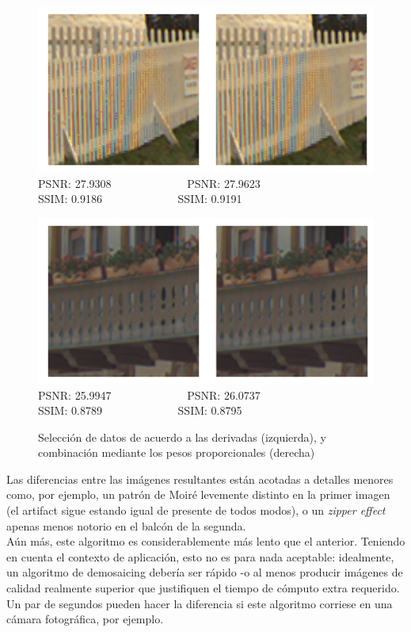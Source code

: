 \documentclass[a4paper]{article}
\begin{document}
\begin{figure}[h!]
	\begin{center}
	    \includegraphics[scale=0.47]{imagenes/Splines/RecortesSplines/prop/cerco.png}\\
	    PSNR: 27.9308 \ \ \ \ \ \ \ \ \ \ \ \ \ PSNR: 27.9623\\
	    SSIM: 0.9186 \ \ \ \ \ \ \ \ \ \ \ \ \ SSIM: 0.9191
	\end{center}
	\begin{center}
	    \includegraphics[scale=0.47]{imagenes/Splines/RecortesSplines/prop/balcon.png}\\
	    PSNR: 25.9947 \ \ \ \ \ \ \ \ \ \ \ \ \ PSNR: 26.0737\\
	    SSIM: 0.8789 \ \ \ \ \ \ \ \ \ \ \ \ \ SSIM: 0.8795
	\end{center}
	\caption{Selección de datos de acuerdo a las derivadas (izquierda), y combinación mediante los pesos proporcionales (derecha)}
	\label{splines4}
\end{figure}

Las diferencias entre las imágenes resultantes están acotadas a detalles menores como, por ejemplo, un patrón de Moiré levemente distinto en la primer imagen (el artifact sigue estando igual de presente de todos modos), o un \textit{zipper effect} apenas menos notorio en el balcón de la segunda.\\

Aún más, este algoritmo es considerablemente más lento que el anterior. Teniendo en cuenta el contexto de aplicación, esto no es para nada aceptable: idealmente, un algoritmo de demosaicing debería ser rápido -o al menos producir imágenes de calidad realmente superior que justifiquen el tiempo de cómputo extra requerido. Un par de segundos pueden hacer la diferencia si este algoritmo corriese en una cámara fotográfica, por ejemplo.\\
\end{document}

